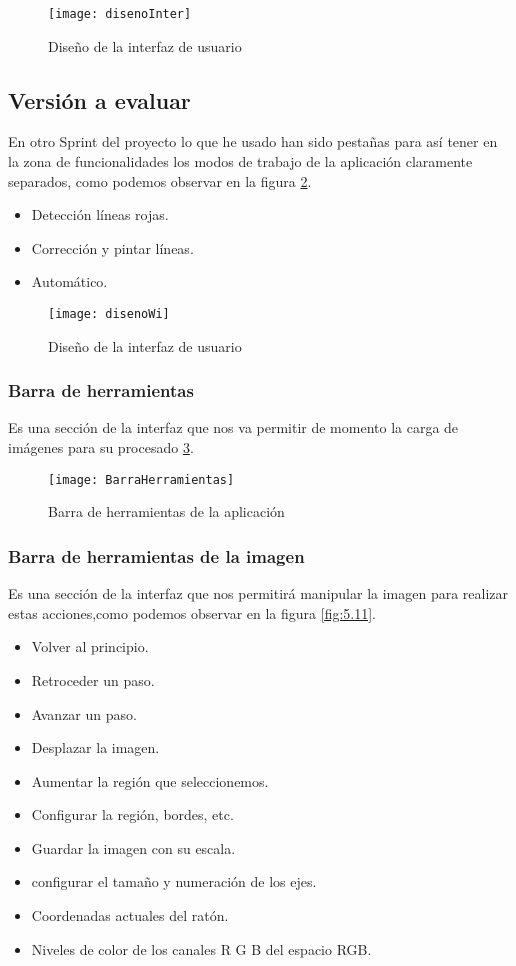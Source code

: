 \begin{figure}[h]
\centering
\texttt{[image: disenoInter]}
\caption{Diseño de la interfaz de usuario}
\label{fig:5.8}
\end{figure}

\subsection{Versión a evaluar}

En otro Sprint del proyecto lo que he usado han sido pestañas para así tener en la zona de funcionalidades los modos de trabajo de la aplicación claramente separados, como podemos observar en la figura \ref{fig:5.9}.

\begin{itemize}
\item Detección líneas rojas.
\item Corrección y pintar líneas.
\item Automático.
\end{itemize}


\begin{figure}[h]
\centering
\texttt{[image: disenoWi]}
\caption{Diseño de la interfaz de usuario}
\label{fig:5.9}
\end{figure}
\subsubsection{Barra de herramientas}
Es una sección de la interfaz que nos va permitir de momento la carga de imágenes para su procesado \ref{fig:5.10}.
\begin{figure}[h]
\centering
\texttt{[image: BarraHerramientas]}
\caption{Barra de herramientas de la aplicación}
\label{fig:5.10}
\end{figure}

\subsubsection{Barra de herramientas de la imagen}
Es una sección de la interfaz que nos permitirá manipular la imagen para realizar estas acciones,como podemos observar en la figura \ref{fig:5.11}.

\begin{itemize}
\item Volver al principio. 
\item Retroceder un paso.
\item Avanzar un paso.
\item Desplazar la imagen.
\item Aumentar la región que seleccionemos.
\item Configurar la región, bordes, etc.
\item Guardar la imagen con su escala.
\item configurar el tamaño y numeración de los ejes.
\item Coordenadas actuales del ratón.
\item Niveles de color de los canales R G B del espacio RGB.
\end{itemize}

